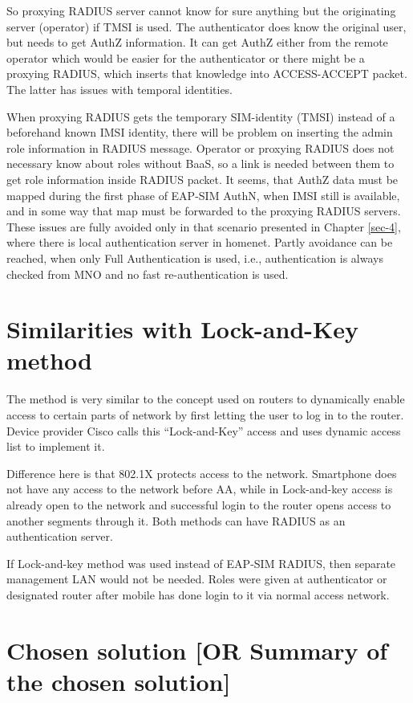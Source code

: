 \documentclass[12pt,a4paper,english]{tutthesis}
\begin{document}
So proxying RADIUS server cannot know for sure anything but the
originating server (operator) if TMSI is used. The authenticator does
know the original user, but needs to get AuthZ information. It can get
AuthZ either from the remote operator which would be easier for the
authenticator or there might be a proxying RADIUS, which inserts that
knowledge into ACCESS-ACCEPT packet. The latter has issues with
temporal identities. 






When proxying RADIUS gets the temporary SIM-identity (TMSI) instead of
a beforehand known IMSI identity, there will be problem
on inserting the admin role information in RADIUS message.
Operator or proxying RADIUS 
does not necessary know about roles without BaaS, so a link
is needed between them to get role information inside RADIUS packet.
It seems, that AuthZ data must be mapped during the first phase of
EAP-SIM AuthN, when IMSI still is available, and in some way
that map must be forwarded to the proxying RADIUS servers.
These issues are fully avoided only in that scenario presented in Chapter
\ref{sec-4}, where there is local authentication server in homenet.
Partly avoidance can be reached, when only Full Authentication is
used, i.e., authentication is always checked from MNO and no fast
re-authentication is used.

\section{Similarities with Lock-and-Key method}
\label{sec-4-8}
The method is very similar to the concept used on routers to dynamically enable
access to certain parts of network by first letting the user to log in
to the router.  
Device provider Cisco calls this ``Lock-and-Key'' access
and uses dynamic access list to implement it. \cite[p.117]{lockandkeybook}

Difference here is that 802.1X protects access to the
network. Smartphone does not have any access to the network before AA, while in Lock-and-key
access is already open to the network and successful login to the router opens
access to another segments through it.
Both methods can have RADIUS as an authentication server.

If Lock-and-key method was used instead of EAP-SIM RADIUS, then
separate management LAN would not be needed. Roles were given at
authenticator or designated router after mobile has done login to it
via normal access network.
\section{Chosen solution [OR Summary of the chosen solution]}
\label{sec-4-9}
\end{document}
